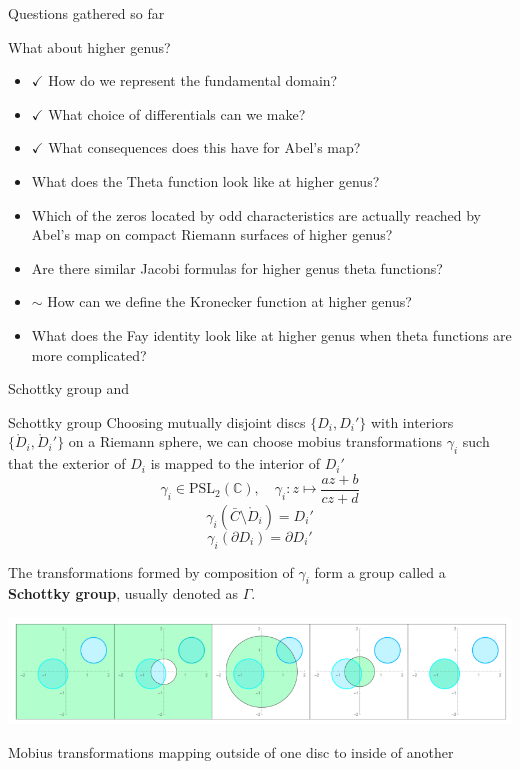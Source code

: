\documentclass[11pt,aspectratio=169]{beamer}
\begin{document}
\begin{frame}{Questions gathered so far}
    {
        \begin{block}{What about higher genus?}
            \begin{itemize}
                \item $\checkmark$ How do we represent the fundamental domain? 
                \item $\checkmark$ What choice of differentials can we make?
                \item $\checkmark$ What consequences does this have for Abel's map?
                \item What does the Theta function look like at higher genus?
                \item Which of the zeros located by odd characteristics are actually reached by Abel's map on compact Riemann surfaces of higher genus?
                \item Are there similar Jacobi formulas for higher genus theta functions?
                \item $\sim$ How can we define the Kronecker function at higher genus?
                \item What does the Fay identity look like at higher genus when theta functions are more complicated?
            \end{itemize}
        \end{block}
    }
\end{frame}

\begin{frame}{Schottky group}{\tiny \cite{ComputationalSchottky} and \cite{Cha22}}
    \begin{block}{Schottky group}
        Choosing mutually disjoint discs $\{D_i,D_i'\}$ with interiors $\{\mathring{D}_i,\mathring{D}_i'\}$ on a Riemann sphere,
        we can choose mobius transformations $\gamma_i$ such that the exterior of $D_i$ is mapped to the interior of $D_i'$
        \[\gamma_i \in \text{PSL}_2(\mathbb C) , \quad \gamma_i : z \mapsto \frac{az+b}{cz+d}\]
        \[\gamma_i(\bar C \setminus \mathring{D}_i) = D_i'\]
        \[\gamma_i(\partial D_i) = \partial D_i'\]

        The transformations formed by composition of $\gamma_i$ form a group called a \textbf{Schottky group}, usually denoted as $\Gamma$.
    \end{block}

    \center{}
    \includegraphics[width=0.7\columnwidth]{assets/ChanSchottkyGroup.png}

    \tiny Mobius transformations mapping outside of one disc to inside of another

    \cite{Cha22}
\end{frame}
\end{document}
